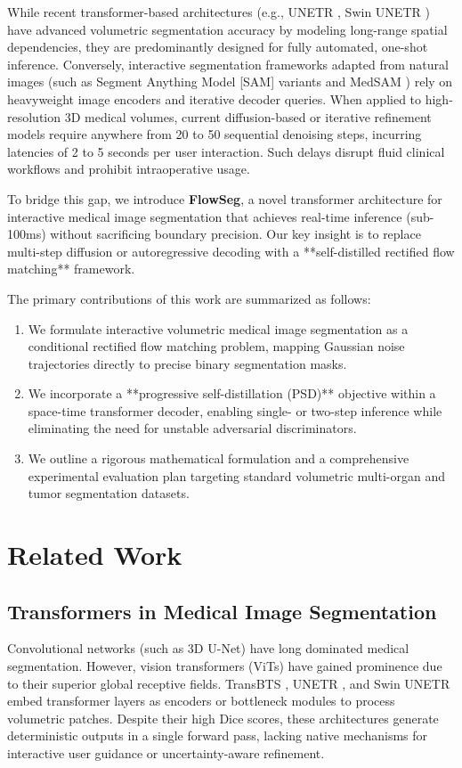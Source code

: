 \documentclass[10.1005,journal]{IEEEtran}
\begin{document}
While recent transformer-based architectures (e.g., UNETR \cite{hatamizadeh2022unetr}, Swin UNETR \cite{hatamizadeh2022swin}) have advanced volumetric segmentation accuracy by modeling long-range spatial dependencies, they are predominantly designed for fully automated, one-shot inference. Conversely, interactive segmentation frameworks adapted from natural images (such as Segment Anything Model [SAM] variants and MedSAM \cite{ma2024segment}) rely on heavyweight image encoders and iterative decoder queries. When applied to high-resolution 3D medical volumes, current diffusion-based or iterative refinement models require anywhere from 20 to 50 sequential denoising steps, incurring latencies of 2 to 5 seconds per user interaction. Such delays disrupt fluid clinical workflows and prohibit intraoperative usage.

To bridge this gap, we introduce \textbf{FlowSeg}, a novel transformer architecture for interactive medical image segmentation that achieves real-time inference (sub-100ms) without sacrificing boundary precision. Our key insight is to replace multi-step diffusion or autoregressive decoding with a **self-distilled rectified flow matching** framework. 

The primary contributions of this work are summarized as follows:
\begin{enumerate}
    \item We formulate interactive volumetric medical image segmentation as a conditional rectified flow matching problem, mapping Gaussian noise trajectories directly to precise binary segmentation masks.
    \item We incorporate a **progressive self-distillation (PSD)** objective within a space-time transformer decoder, enabling single- or two-step inference while eliminating the need for unstable adversarial discriminators.
    \item We outline a rigorous mathematical formulation and a comprehensive experimental evaluation plan targeting standard volumetric multi-organ and tumor segmentation datasets.
\end{enumerate}

\section{Related Work}
\subsection{Transformers in Medical Image Segmentation}
Convolutional networks (such as 3D U-Net) have long dominated medical segmentation. However, vision transformers (ViTs) have gained prominence due to their superior global receptive fields. TransBTS \cite{wang2021transbts}, UNETR \cite{hatamizadeh2022unetr}, and Swin UNETR \cite{hatamizadeh2022swin} embed transformer layers as encoders or bottleneck modules to process volumetric patches. Despite their high Dice scores, these architectures generate deterministic outputs in a single forward pass, lacking native mechanisms for interactive user guidance or uncertainty-aware refinement.
\end{document}
